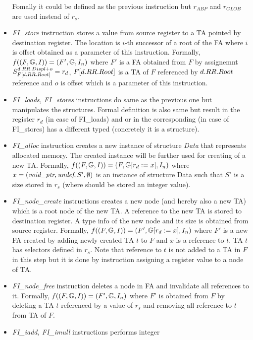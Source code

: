\begin{itemize}
		Fomally it could be defined as the previous instruction but
		$r_{ABP}$ and $r_{GLOB}$ are used instead of $r_s$.
	\item \emph{FI\_store} instruction stores a value from source register
		to a TA pointed by destination register.
		The location is $i$-th successor of a root of the FA where $i$ is offset
		obtained as a parameter of this instruction.
		Formally, $f((F, \mathbb{G}, I)) = (F', \mathbb{G}, I_n)$
		where $F'$ is a FA obtained from $F$ by assignemnt
		$S_{F[d.RR.Root]}^{d.RR.Displ + o} = r_{d}$,
		$F[d.RR.Root]$ is a TA of $F$ referenced by $d.RR.Root$ reference
		and $o$ is offset which is a parameter of this instruction.
	\item \emph{FI\_loads, FI\_stores} instructions do same as the previous
		one but manipulates the structures.
		Formal definition is also same but result in the register $r_d$ (in case of FI\_loads)
		and or in the corresponding (in case of FI\_stores) has a different typed
		(concretely it is a structure).
	\item \emph{FI\_alloc} instruction creates a new instance of structure \emph{Data}
		that represents allocated memory.
		The created instance will be further used for creating of a new TA.
		Formally, $f((F, \mathbb{G}, I)) = (F, 
		\mathbb{G} [
			r_{d} := x], I_n)$
		where $x=(\emph{void\_ptr},\emph{undef},S',\emptyset)$ is an instance of structure Data
		such that $S'$ is a size stored in $r_s$ (where should be stored an integer value). 
	\item \emph{FI\_node\_create} instructions creates a new node
		(and hereby also a new TA) which is a root node of the new TA.
		A reference to the new TA is stored to destination register.
		A type info of the new node and its size is obtained from source
		register.
		Formally, $f((F, \mathbb{G}, I)) = (F', 
		\mathbb{G} [
			r_{d} := x], I_n)$
		where $F'$ is a new FA created by adding newly created TA $t$ to $F$
		and $x$ is a reference to $t$.
		TA $t$ has selectors defined in $r_s$. 
		Note that reference to $t$ is not added to a TA in $F$ in this step
		but it is done by instruction assigning a register value to a
		node of TA.
	\item \emph{FI\_node\_free} instruction deletes a node in FA and
		invalidate all references to it.
		Formally, $f((F, \mathbb{G}, I)) = (F', \mathbb{G}, I_n)$
		where $F'$ is obtained from $F$ by deleting a TA $t$ referenced
		by a value of $r_s$ and removing all reference to $t$ from TA of $F$.
	\item \emph{FI\_iadd, FI\_imull} instructions performs integer

\end{itemize}
